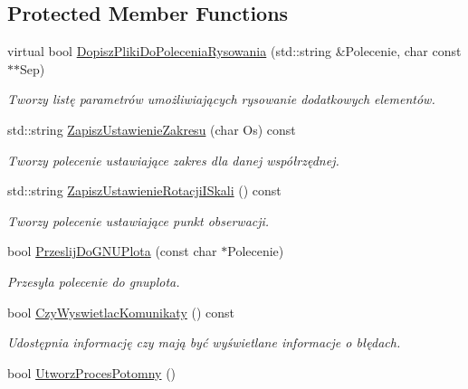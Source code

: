 \subsection*{Protected Member Functions}
\begin{DoxyCompactItemize}
\item 
virtual bool \mbox{\hyperlink{class_pz_g_1_1_lacze_do_g_n_u_plota_a25585ec3f1bd3b6bf42f374c38b8d237}{Dopisz\+Pliki\+Do\+Polecenia\+Rysowania}} (std\+::string \&Polecenie, char const $\ast$$\ast$Sep)
\begin{DoxyCompactList}\small\item\em Tworzy listę parametrów umożliwiających rysowanie dodatkowych elementów. \end{DoxyCompactList}\item 
std\+::string \mbox{\hyperlink{class_pz_g_1_1_lacze_do_g_n_u_plota_a4579aecf7b4777fdde0cae4e98c275c2}{Zapisz\+Ustawienie\+Zakresu}} (char Os) const
\begin{DoxyCompactList}\small\item\em Tworzy polecenie ustawiające zakres dla danej współrzędnej. \end{DoxyCompactList}\item 
std\+::string \mbox{\hyperlink{class_pz_g_1_1_lacze_do_g_n_u_plota_aa92b463e8cbae31b50dd797a4183bce8}{Zapisz\+Ustawienie\+Rotacji\+I\+Skali}} () const
\begin{DoxyCompactList}\small\item\em Tworzy polecenie ustawiające punkt obserwacji. \end{DoxyCompactList}\item 
bool \mbox{\hyperlink{class_pz_g_1_1_lacze_do_g_n_u_plota_a5063854b7232a7951d120a21df63f2b7}{Przeslij\+Do\+G\+N\+U\+Plota}} (const char $\ast$Polecenie)
\begin{DoxyCompactList}\small\item\em Przesyła polecenie do gnuplota. \end{DoxyCompactList}\item 
bool \mbox{\hyperlink{class_pz_g_1_1_lacze_do_g_n_u_plota_a5e4f3a226ed36f7110032d802d84847c}{Czy\+Wyswietlac\+Komunikaty}} () const
\begin{DoxyCompactList}\small\item\em Udostępnia informację czy mają być wyświetlane informacje o błędach. \end{DoxyCompactList}\item 
bool \mbox{\hyperlink{class_pz_g_1_1_lacze_do_g_n_u_plota_a1c7b9acc40de8d8bbb40fb0722512933}{Utworz\+Proces\+Potomny}} ()
$$
\end{DoxyCompactItemize}
